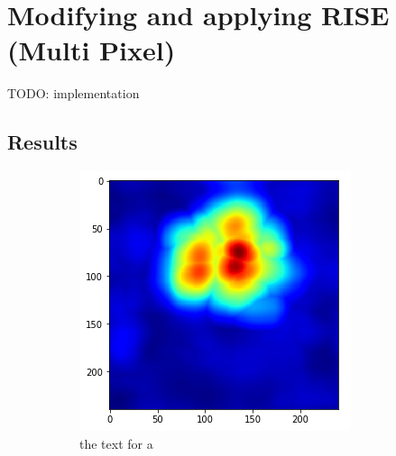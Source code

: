 \section{Modifying and applying RISE (Multi Pixel)}

TODO: implementation

\subsection{Results}
\begin{figure}[H]
    \centering
    \begin{subfigure}{.5\textwidth}
        \centering
        \includegraphics[width=\linewidth]{chapters/04_segmentation/images/rise_multipixel_max_1-0.png}
        \caption{ the text for a}
    \end{subfigure}%
    \begin{subfigure}{.5\textwidth}
        \centering

\end{subfigure}
\end{figure}
